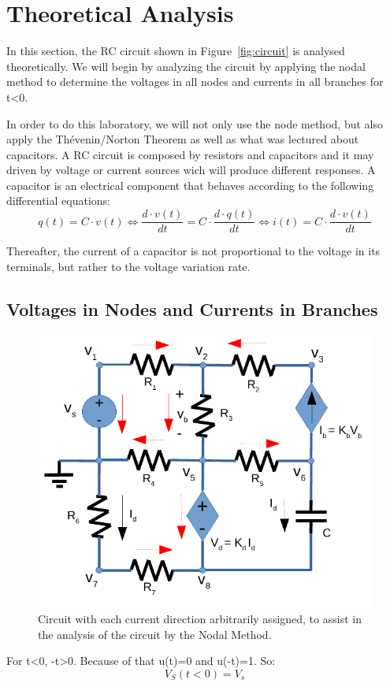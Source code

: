 \section{Theoretical Analysis}
\label{sec:analysis}
In this section, the RC circuit shown in Figure~\ref{fig:circuit} is analysed
theoretically. We will begin by analyzing the circuit by applying the nodal method to determine the voltages in all nodes and currents in all branches for t\textless 0.

In order to do this laboratory, we will not only use the node method, but also apply the Thévenin/Norton Theorem as well as what was lectured about capacitors.
A RC circuit is composed by resistors and capacitors and it may driven by voltage or current sources wich will produce different responses.
A capacitor is an electrical component that behaves according to the following differential equations:
\begin{equation}
  q(t)=C\cdot v(t)\Leftrightarrow \frac{d\cdot v(t)}{dt} = C\cdot \frac{d\cdot q(t)}{dt}\Leftrightarrow i(t)=C\cdot \frac{d\cdot v(t)}{dt}
\end{equation}

Thereafter, the current of a capacitor is not proportional to the voltage in its terminals, but rather to the voltage variation rate.

\subsection{Voltages in Nodes and Currents in Branches}

\begin{figure}[H] \centering
\includegraphics[width=0.4\linewidth]{mcurrents.pdf}
\caption{Circuit with each current direction arbitrarily assigned, to assist in the analysis of the circuit by the Nodal Method.}
\label{fig:nvoltages}
\end{figure}

For t\textless 0, -t\textgreater 0. Because of that u(t)=0 and u(-t)=1. So:
\begin{equation}
  V_S(t<0)=V_s
\end{equation}

